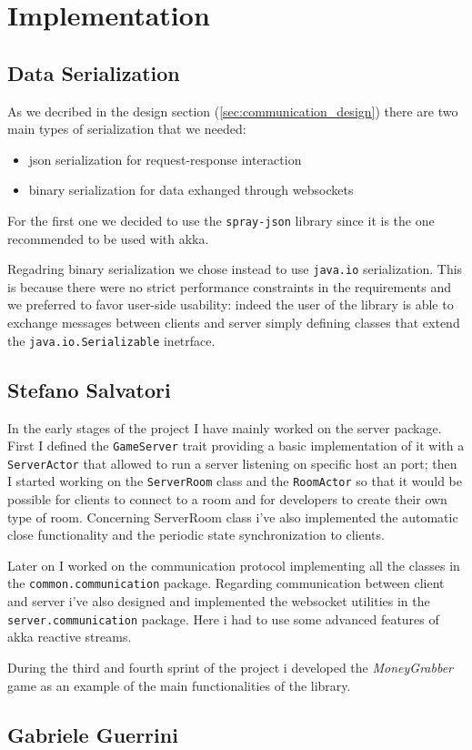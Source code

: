\chapter{Implementation}
\section{Data Serialization}
As we decribed in the design section (\ref{sec:communication_design}) there are two main types of serialization that we needed:
\begin{itemize}
	\item json serialization for request-response interaction
	\item binary serialization for  data exhanged through websockets
\end{itemize}

For the first one we decided to use the \texttt{spray-json} library since it is the one recommended to be used with akka.

Regadring binary serialization we chose instead to use \texttt{java.io} serialization. This is because there were no strict performance constraints in the requirements and we preferred to favor user-side usability: indeed the user of the library is able to exchange messages between clients and server simply defining classes that extend the \texttt{java.io.Serializable} inetrface.



\section{Stefano Salvatori}
In the early stages of the project I have mainly worked on the server package. First I defined the \texttt{GameServer} trait providing a basic implementation of it with a \texttt{ServerActor} that allowed to run a server listening on specific host an port; then I started working on the \texttt{ServerRoom} class and the \texttt{RoomActor} so that it would be possible for clients to connect to a room and for developers to create their own type of room. Concerning ServerRoom class i've also implemented the automatic close functionality and the periodic state synchronization to clients.

Later on I worked on the communication protocol implementing all the classes in the \texttt{common.communication} package. Regarding communication between client and server i've also designed and implemented the websocket utilities in the \texttt{server.communication} package. Here i had to use some advanced features of akka reactive streams. 

During the third and fourth sprint of the project i developed the \textit{MoneyGrabber} game as an example of the main functionalities of the library. 

\section{Gabriele Guerrini}













